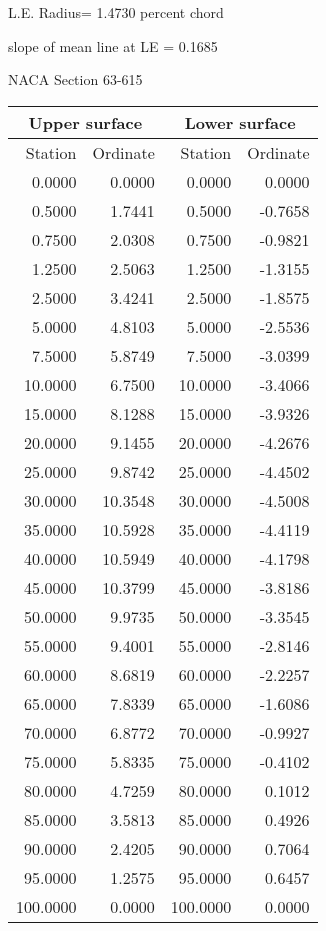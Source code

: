\documentclass[11pt]{book}
\begin{document}
L.E. Radius=  1.4730 percent chord


 slope of mean line at LE =  0.1685
 \newpage
  \label{s63-615}
 \begin{Large}
 NACA Section 63-615
 \end{Large}
  
 \vspace{8mm}
 \begin{tabular}{|r|r|r|r|} \hline 
 \multicolumn{2}{|c|}{Upper surface} & \multicolumn{2}{|c|}{Lower surface} \\
 \hline
 Station & Ordinate & Station & Ordinate \\
 \hline
0.0000 & 0.0000 & 0.0000 & 0.0000 \\
0.5000 & 1.7441 & 0.5000 & -0.7658 \\
0.7500 & 2.0308 & 0.7500 & -0.9821 \\
1.2500 & 2.5063 & 1.2500 & -1.3155 \\
2.5000 & 3.4241 & 2.5000 & -1.8575 \\
5.0000 & 4.8103 & 5.0000 & -2.5536 \\
7.5000 & 5.8749 & 7.5000 & -3.0399 \\
10.0000 & 6.7500 & 10.0000 & -3.4066 \\
15.0000 & 8.1288 & 15.0000 & -3.9326 \\
20.0000 & 9.1455 & 20.0000 & -4.2676 \\
25.0000 & 9.8742 & 25.0000 & -4.4502 \\
30.0000 & 10.3548 & 30.0000 & -4.5008 \\
35.0000 & 10.5928 & 35.0000 & -4.4119 \\
40.0000 & 10.5949 & 40.0000 & -4.1798 \\
45.0000 & 10.3799 & 45.0000 & -3.8186 \\
50.0000 & 9.9735 & 50.0000 & -3.3545 \\
55.0000 & 9.4001 & 55.0000 & -2.8146 \\
60.0000 & 8.6819 & 60.0000 & -2.2257 \\
65.0000 & 7.8339 & 65.0000 & -1.6086 \\
70.0000 & 6.8772 & 70.0000 & -0.9927 \\
75.0000 & 5.8335 & 75.0000 & -0.4102 \\
80.0000 & 4.7259 & 80.0000 & 0.1012 \\
85.0000 & 3.5813 & 85.0000 & 0.4926 \\
90.0000 & 2.4205 & 90.0000 & 0.7064 \\
95.0000 & 1.2575 & 95.0000 & 0.6457 \\
100.0000 & 0.0000 & 100.0000 & 0.0000 \\
 \hline 
 \end{tabular}
\end{document}
